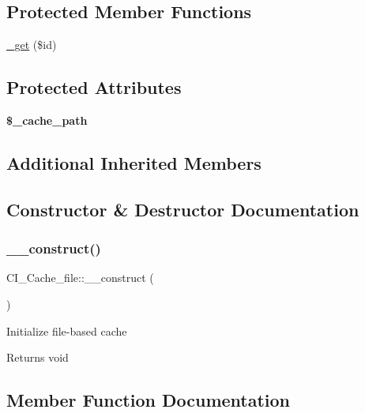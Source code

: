 \subsection*{Protected Member Functions}
\begin{DoxyCompactItemize}
\item 
\mbox{\hyperlink{class_c_i___cache__file_aed3309aca83bff0ebb5cb2d5b0393b13}{\+\_\+get}} (\$id)
\end{DoxyCompactItemize}
\subsection*{Protected Attributes}
\begin{DoxyCompactItemize}
\item 
\mbox{\label{class_c_i___cache__file_a3e429b515321a23df70fcfa7253ef825}} 
{\bfseries \$\+\_\+cache\+\_\+path}
\end{DoxyCompactItemize}
\subsection*{Additional Inherited Members}


\subsection{Constructor \& Destructor Documentation}
\mbox{\label{class_c_i___cache__file_aa972f330341b04483829e8aa464d689d}} 
\subsubsection{\texorpdfstring{\+\_\+\+\_\+construct()}{\_\_construct()}}
{\footnotesize\ttfamily C\+I\+\_\+\+Cache\+\_\+file\+::\+\_\+\+\_\+construct (\begin{DoxyParamCaption}{ }\end{DoxyParamCaption})}

Initialize file-\/based cache

\begin{DoxyReturn}{Returns}
void 
\end{DoxyReturn}


\subsection{Member Function Documentation}
\mbox{\label{class_c_i___cache__file_aed3309aca83bff0ebb5cb2d5b0393b13}} 
